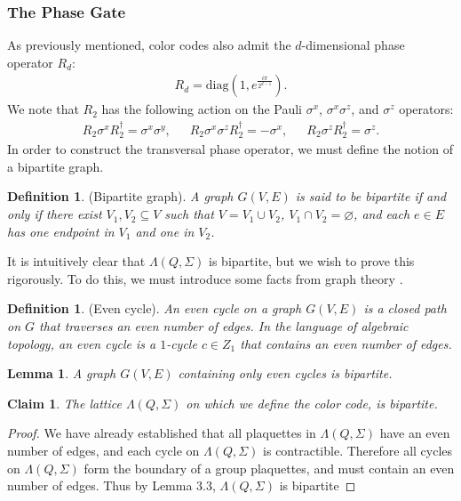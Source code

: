 \documentclass[12pt]{article}
\let\emptyset\varnothing
\newtheorem{claim}[theorem]{Claim}
\newtheorem{lemma}[theorem]{Lemma}
\theoremstyle{definition}
\newtheorem{definition}[theorem]{Definition}
\begin{document}
\subsubsection{The Phase Gate}
As previously mentioned, color codes also admit the $d$-dimensional phase operator $R_d$:
    \begin{align}
        R_d = \text{diag}(1,e^{\frac{i\pi}{2^{d-1}}}).
    \end{align}
We note that $R_2$ has the following action on the Pauli $\sigma^x$, $\sigma^x\sigma^z$, and $\sigma^z$ operators:
    \begin{align}
        R_2\sigma^xR^\dagger_2 = \sigma^x\sigma^y,\enspace\enspace\enspace R_2\sigma^x\sigma^zR^\dagger_2 = -\sigma^x,\enspace\enspace\enspace R_2\sigma^zR^\dagger_2 = \sigma^z.
    \end{align}
In order to construct the transversal phase operator, we must define the notion of a bipartite graph.
    \begin{definition}(Bipartite graph).
        \emph{A graph $G(V,E)$ is said to be bipartite if and only if there exist $V_1,V_2\subseteq V$ such that $V = V_1\cup V_2$, $V_1\cap V_2 = \emptyset$, and each $e\in E$ has one endpoint in $V_1$ and one in $V_2$.}
    \end{definition}
It is intuitively clear that $\Lambda(Q,\Sigma)$ is bipartite, but we wish to prove this rigorously. To do this, we must introduce some facts from graph theory \cite{kubica2014}.
    \begin{definition}(Even cycle).
        \emph{An even cycle on a graph $G(V,E)$ is a closed path on $G$ that traverses an even number of edges. In the language of algebraic topology, an even cycle is a $1$-cycle $c\in Z_1$ that contains an even number of edges.}
    \end{definition}
    \begin{lemma}
        A graph $G(V,E)$ containing only even cycles is bipartite.
    \end{lemma}
    \begin{claim}
        The lattice $\Lambda(Q,\Sigma)$ on which we define the color code, is bipartite.
    \end{claim}
    \begin{proof}
        We have already established that all plaquettes in $\Lambda(Q,\Sigma)$ have an even number of edges, and each cycle on $\Lambda(Q,\Sigma)$ is contractible. Therefore all cycles on $\Lambda(Q,\Sigma)$ form the boundary of a group plaquettes, and must contain an even number of edges. Thus by Lemma $3.3$, $\Lambda(Q,\Sigma)$ is bipartite
    \end{proof}
\end{document}
